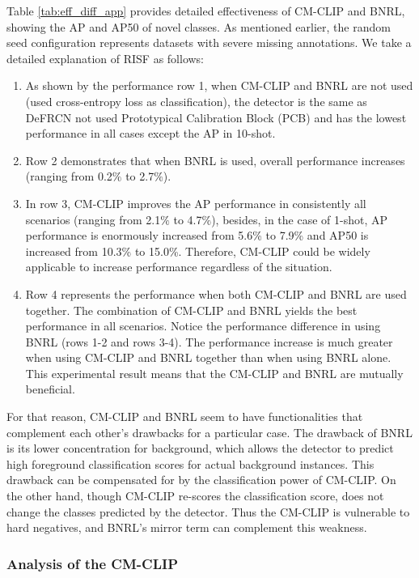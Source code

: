 \documentclass{article}
\begin{document}
Table \ref{tab:eff_diff_app} provides detailed effectiveness of CM-CLIP and BNRL, showing the AP and AP50 of novel classes.
As mentioned earlier, the random seed configuration represents datasets with severe missing annotations. We take a detailed explanation of RISF as follows:
\begin{enumerate}
    \item As shown by the performance row 1, when CM-CLIP and BNRL are not used (used cross-entropy loss as classification), the detector is the same as DeFRCN \cite{defrcn} not used Prototypical Calibration Block (PCB) and has the lowest performance in all cases except the AP in 10-shot.
    \item Row 2 demonstrates that when BNRL is used, overall performance increases (ranging from 0.2$\%$ to 2.7$\%$).
    \item In row 3, CM-CLIP improves the AP performance in consistently all scenarios (ranging from 2.1$\%$ to 4.7$\%$),
    besides, in the case of 1-shot, AP performance is enormously increased from 5.6\% to 7.9\% and AP50 is increased from 10.3\% to 15.0\%. 
    Therefore, CM-CLIP could be widely applicable to increase performance regardless of the situation.
    \item Row 4 represents the performance when both CM-CLIP and BNRL are used together. 
    The combination of CM-CLIP and BNRL yields the best performance in all scenarios. 
    Notice the performance difference in using BNRL (rows 1-2 and rows 3-4). The performance increase is much greater when using CM-CLIP and BNRL together than when using BNRL alone.
    This experimental result means that the CM-CLIP and BNRL are mutually beneficial.
\end{enumerate}

For that reason, CM-CLIP and BNRL seem to have functionalities that complement each other's drawbacks for a particular case. The drawback of BNRL is its lower concentration for background, which allows the detector to predict high foreground classification scores for actual background instances. This drawback can be compensated for by the classification power of CM-CLIP. On the other hand, though CM-CLIP re-scores the classification score, does not change the classes predicted by the detector. Thus the CM-CLIP is vulnerable to hard negatives, and BNRL's mirror term can complement this weakness. 

\subsubsection{Analysis of the CM-CLIP}
\end{document}
